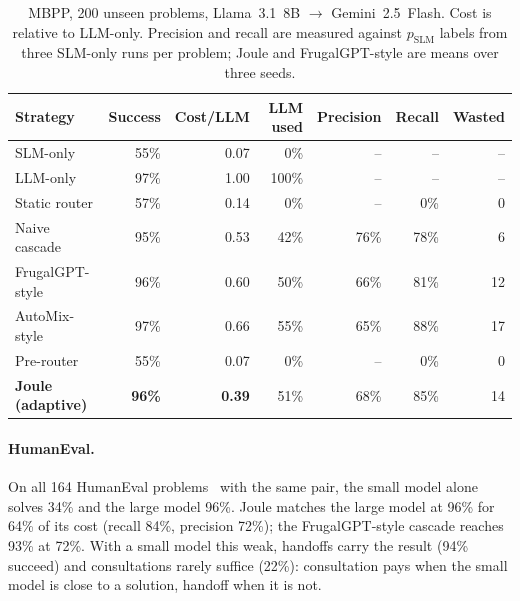 \begin{table}[t]
\centering
\small
\caption{MBPP, 200 unseen problems, Llama~3.1~8B $\rightarrow$ Gemini~2.5~Flash. Cost is relative to LLM-only. Precision and recall are measured against $p_{\text{SLM}}$ labels from three SLM-only runs per problem; Joule and FrugalGPT-style are means over three seeds.}
\label{tab:escalation-mbpp}
\begin{tabular}{lrrrrrr}
\toprule
Strategy & Success & Cost/LLM & LLM used & Precision & Recall & Wasted \\
\midrule
SLM-only & 55\% & 0.07 & 0\% & -- & -- & -- \\
LLM-only & 97\% & 1.00 & 100\% & -- & -- & -- \\
Static router & 57\% & 0.14 & 0\% & -- & 0\% & 0 \\
Naive cascade & 95\% & 0.53 & 42\% & 76\% & 78\% & 6 \\
FrugalGPT-style & 96\% & 0.60 & 50\% & 66\% & 81\% & 12 \\
AutoMix-style & 97\% & 0.66 & 55\% & 65\% & 88\% & 17 \\
Pre-router & 55\% & 0.07 & 0\% & -- & 0\% & 0 \\
\textbf{Joule (adaptive)} & \textbf{96\%} & \textbf{0.39} & 51\% & 68\% & 85\% & 14 \\
\bottomrule
\end{tabular}
\end{table}

\paragraph{HumanEval.}
On all 164 HumanEval problems~\cite{chen2021humaneval} with the same pair, the small model alone solves 34\% and the large model 96\%.
Joule matches the large model at 96\% for 64\% of its cost (recall 84\%, precision 72\%); the FrugalGPT-style cascade reaches 93\% at 72\%.
With a small model this weak, handoffs carry the result (94\% succeed) and consultations rarely suffice (22\%): consultation pays when the small model is close to a solution, handoff when it is not.

